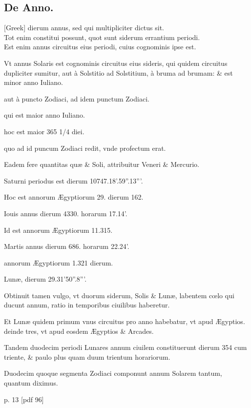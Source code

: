 \subsection{De Anno.}
\setcounter{parcount}{0}
\begin{parnumbers}

 \textgreek{[Greek]}
 dierum annus, sed qui multipliciter dictus
sit. \\ \p
Tot enim constitui possunt, quot sunt siderum errantium
periodi.\\ \p
Est enim annus circuitus eius periodi, cuius cognominis
ipse est.

Vt annus Solaris est cognominis circuitus eius  sideris,
qui quidem circuitus dupliciter sumitur, aut à Solstitio ad Solstitium,
à bruma ad brumam: \& est minor anno Iuliano.

aut à puncto Zodiaci,
ad idem punctum Zodiaci.

qui est maior anno Iuliano.

hoc est maior 365 1/4 diei.

quo ad id puncum Zodiaci redit, vnde profectum
erat.

Eadem fere quantitas quæ \& Soli, attribuitur Veneri \& Mercurio.

Saturni periodus est dierum 10747.18'.59''.13'''.

Hoc est annorum
Ægyptiorum 29. dierum 162.

Iouis annus dierum 4330. horarum 17.14'.

Id est annorum Ægyptiorum 11.315.

Martis annus dierum
686. horarum 22.24'.

annorum Ægyptiorum 1.321 dierum.

Lunæ,
dierum 29.31'50''.8'''.

Obtinuit tamen vulgo, vt duorum siderum,
Solis \& Lunæ, labentem cœlo qui ducunt annum, ratio in  temporibus
ciuilibus haberetur.

Et Lunæ quidem primum vnus circuitus
pro anno habebatur, vt apud Ægyptios. deinde tres, vt apud eosdem
Ægyptios \& Arcades.

Tandem duodecim periodi Lunares annum
ciuilem constituerunt dierum 354 cum triente, \& paulo plus quam
duum trientum horariorum.

Duodecim quoque segmenta Zodiaci
componunt annum Solarem tantum, quantum diximus.

\end{parnumbers}
\clearpage
p. 13 [pdf 96]
